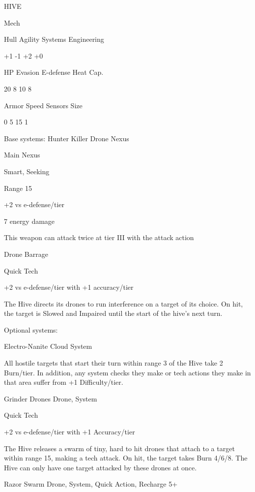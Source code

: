  HIVE 

 Mech 

 Hull       Agility      Systems       Engineering 

 +1         -1           +2            +0 

 HP         Evasion      E-defense     Heat Cap. 

 20         8            10            8 

 Armor      Speed        Sensors       Size 

 0          5            15            1 

Base systems:  
Hunter Killer Drone Nexus
 
Main Nexus
 
Smart, Seeking
 
Range 15
 
+2 vs e-defense/tier
 
7 energy damage
 
This weapon can attack twice at tier III with the attack action
 

Drone Barrage
 
Quick Tech
 
+2 vs e-defense/tier with +1 accuracy/tier
 
The Hive directs its drones to run interference on a target of its choice. On hit, the target is  
Slowed and Impaired until the start of the hive’s next turn.
 

Optional systems:
 
Electro-Nanite Cloud  
System
 

                                                                                                          


All hostile targets that start their turn within range 3 of the Hive take 2 Burn/tier. In addition, any  
system checks they make or tech actions they make in that area suffer from +1 Difficulty/tier.
 

Grinder Drones  
Drone, System
 
Quick Tech
 
+2 vs e-defense/tier with +1 Accuracy/tier
 
The Hive releases a swarm of tiny, hard to hit drones that attach to a target within range 15,  
making a tech attack. On hit, the target takes Burn 4/6/8. The Hive can only have one target  
attacked by these drones at once.
 

Razor Swarm  
Drone, System, Quick Action, Recharge 5+
 
